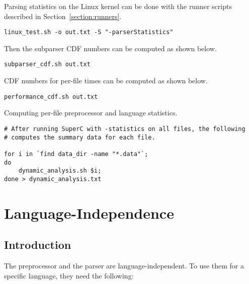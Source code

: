 \documentclass{report}
\begin{document}
Parsing statistics on the Linux kernel can be done with the runner
scripts described in Section~\ref{section:runners}.

\begin{verbatim}
linux_test.sh -o out.txt -S "-parserStatistics"
\end{verbatim}

Then the subparser CDF numbers can be computed as shown below.

\begin{verbatim}
subparser_cdf.sh out.txt
\end{verbatim}

CDF numbers for per-file times can be computed as shown below.

\begin{verbatim}
performance_cdf.sh out.txt
\end{verbatim}

Computing per-file preprocessor and language statistics.

\begin{verbatim}
# After running SuperC with -statistics on all files, the following
# computes the summary data for each file.

for i in `find data_dir -name "*.data"`;
do
    dynamic_analysis.sh $i;
done > dynamic_analysis.txt
\end{verbatim}




\chapter{Language-Independence}


\section{Introduction}

The preprocessor and the parser are language-independent.  To use them
for a specific language, they need the following:
\end{document}
